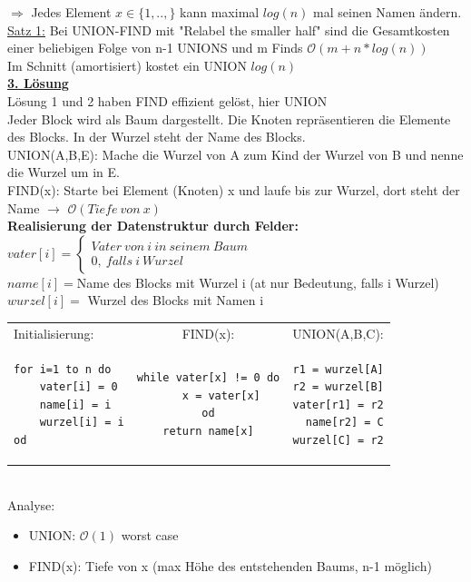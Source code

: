 \documentclass[a4paper]{article}
\newcommand{\oh}[1]{$\mathcal{O}(#1)$}
\begin{document}
$\Rightarrow$ Jedes Element $x\in \{1,..,\}$ kann maximal $log(n)$ mal seinen Namen ändern.\\
\underline{Satz 1:}
Bei UNION-FIND mit "Relabel the smaller half" sind die Gesamtkosten einer beliebigen Folge von n-1 UNIONS und m Finds \oh{m+n*log(n)}\\
Im Schnitt (amortisiert) kostet ein UNION $log(n)$\\
\underline{\textbf{3. Lösung}}\\
Lösung 1 und 2 haben FIND effizient gelöst, hier UNION\\
Jeder Block wird als Baum dargestellt. Die Knoten repräsentieren die Elemente des Blocks. In der Wurzel steht der Name des Blocks.\\
UNION(A,B,E): Mache die Wurzel von A zum Kind der Wurzel von B und nenne die Wurzel um in E.\\
FIND(x): Starte bei Element (Knoten) x und laufe bis zur Wurzel, dort steht der Name $\rightarrow$ \oh{Tiefe\ von\ x}\\
\textbf{Realisierung der Datenstruktur durch Felder:}\\
$vater[i]=\left\lbrace \begin{array}{c}Vater\ von\ i\ in\ seinem\ Baum\\ 0,\ falls\ i\ Wurzel\end{array}\right.$\\ %
$name[i]=$Name des Blocks mit Wurzel i (at nur Bedeutung, falls i Wurzel)\\
$wurzel[i]=$ Wurzel des Blocks mit Namen i\\
\begin{tabular}{ l c r }
Initialisierung: & FIND(x): & UNION(A,B,C):\\
\begin{lstlisting}
for i=1 to n do
	vater[i] = 0
	name[i] = i
	wurzel[i] = i
od
\end{lstlisting}
&
\begin{lstlisting}
while vater[x] != 0 do
	x = vater[x]
od
return name[x]
\end{lstlisting}&
\begin{lstlisting}
r1 = wurzel[A]
r2 = wurzel[B]
vater[r1] = r2
name[r2] = C
wurzel[C] = r2
\end{lstlisting}

\end{tabular}\\
Analyse:
\begin{itemize}
\item UNION: \oh{1} worst case
\item FIND(x): Tiefe von x (max Höhe des entstehenden Baums, n-1 möglich)
\end{itemize}
\end{document}

